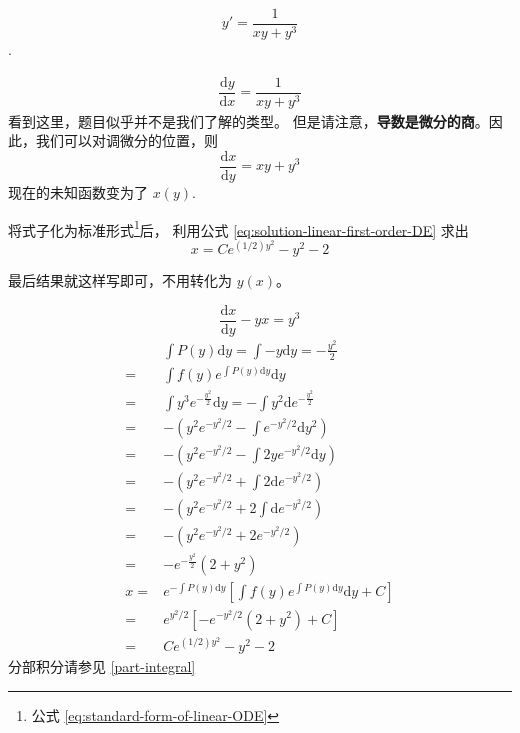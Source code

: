 \begin{example}
    \[
        y' = \dfrac{1}{xy + y^3}
    \]
    \cite[page 143, pdf 154]{we}.

    \begin{align*}
        \dfrac{\mathrm{d}y}{\mathrm{d}x} = \dfrac{1}{xy + y^3}
    \end{align*}
    看到这里，题目似乎并不是我们了解的类型。
    但是请注意，\textbf{导数是微分的商}。因此，我们可以对调微分的位置，则
    \[
        \dfrac{\mathrm{d}x}{\mathrm{d}y} = {xy + y^3}
    \]
    现在的未知函数变为了 $x(y)$. 

    将式子化为标准形式\footnote{公式 \ref{eq:standard-form-of-linear-ODE}}后，
    利用公式 \ref{eq:solution-linear-first-order-DE} 求出
    \[
        x = C e^{(1/2) y^2} - y^2 - 2
    \]

    最后结果就这样写即可，不用转化为 $y(x)$。

    \begin{equation*}
        \dfrac{\mathrm{d}x}{\mathrm{d}y} - yx = y^3
    \end{equation*}
    \begin{align*}
         &\int {P(y)} \mathrm dy = \int {-y} \mathrm dy = -\frac{y^2}{2}\\
        =&\int f(y) e^{\int P(y) \mathrm dy} \mathrm dy \\
        =&\int y^3 e^{-\frac{y^2}{2}} \mathrm dy = -\int y^2 \mathrm d e^{-\frac{y^2}{2}} \\
        =&-\left(y^2 e^{-y^2/2} - \int e^{-y^2/2} \mathrm dy^2\right)\\
        =&-\left(y^2 e^{-y^2/2} - \int 2y e^{-y^2/2} \mathrm dy\right)\\
        =&-\left(y^2 e^{-y^2/2} + \int 2 \mathrm de^{-y^2/2}\right)\\
        =&-\left(y^2 e^{-y^2/2} + 2\int \mathrm de^{-y^2/2}\right)\\
        =&-\left(y^2 e^{-y^2/2} + 2e^{-y^2/2}\right)\\
        =&-e^{-\frac{y^2}{2}} (2 + y^2)\\
        x=&e^{-\int P(y) \mathrm dy} \left[\int f(y) e^{\int P(y) \mathrm dy} \mathrm dy + C\right] \\
        =&e^{y^2/2} \left[-e^{-y^2/2}\left(2+y^2\right) + C\right] \\
        =& C e^{(1/2) y^2} - y^2 - 2
    \end{align*}
    分部积分请参见 \ref{part-integral}
\end{example}

